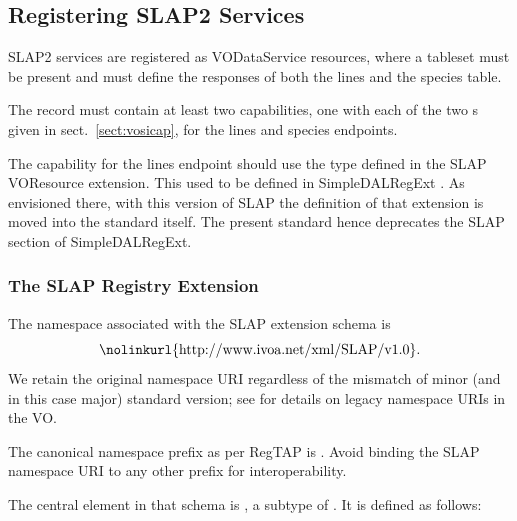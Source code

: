 \documentclass[11pt,a4paper]{ivoa}
\begin{document}
\subsection{Registering SLAP2 Services}

SLAP2 services are registered as VODataService
\citep{2021ivoa.spec.1102D}  resources, where a
tableset must be present and must define the responses of both the lines
and the species table.

The record must contain at least two capabilities, one with each of the
two s given in sect.~\ref{sect:vosicap}, for the lines
and species endpoints.

The capability for the lines endpoint should use the
 type defined in the SLAP VOResource
extension.  This used to be defined in SimpleDALRegExt
\citep{2022ivoa.spec.0222D}.  As envisioned there, with this version of
SLAP the definition of that extension is moved into the standard itself.
The present standard hence deprecates the SLAP section of SimpleDALRegExt.

\subsubsection{The SLAP Registry Extension}

The namespace associated with the SLAP extension schema is
$$\hbox{\nolinkurl{http://www.ivoa.net/xml/SLAP/v1.0}}.$$  We retain the
original namespace URI regardless of the mismatch of minor (and in this
case major) standard version; see \citet{2018ivoa.spec.0529H} for
details on legacy namespace URIs in the VO.

The canonical namespace prefix as per RegTAP \citep{2024ivoa.spec.1002D}
is .  Avoid binding the SLAP namespace URI to any other prefix
for interoperability.

The central element in that schema is , a
subtype of .  It is defined as follows:
\end{document}
